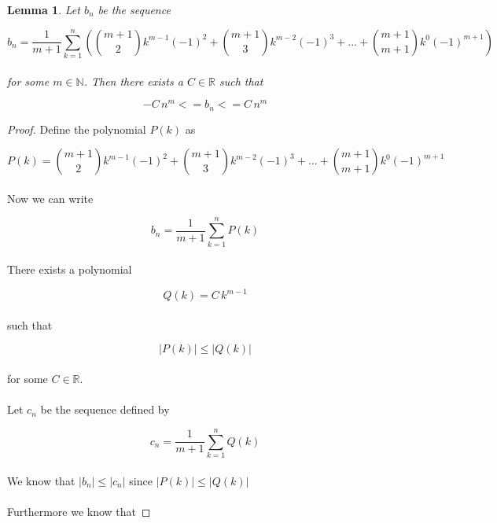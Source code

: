 \documentclass{article}
\newtheorem{lemma}{Lemma}
\begin{document}
\begin{lemma}
Let $b_{n}$ be the sequence 

\begin{equation*}
b_{n} = \frac{1}{m+1} \displaystyle \sum_{k=1}^{n} \left( \binom{m+1}{2} k^{m-1} (-1)^2 +  \binom{m+1}{3} k^{m-2} (-1)^3 + ... +  \binom{m+1}{m+1} k^{0} (-1)^{m+1} \right) 
\end{equation*}
\\
for some $m \in \mathbb{N}$. Then there exists a $C \in \mathbb{R}$ such that

\begin{equation*}
-C \, n^{m} <= b_{n} <= C \, n^{m}
\end{equation*}

\end{lemma}

\begin{proof}
Define the polynomial $P(k)$ as 

\begin{equation*}
P(k) = \binom{m+1}{2} k^{m-1} (-1)^2 +  \binom{m+1}{3} k^{m-2} (-1)^3 + ... +  \binom{m+1}{m+1} k^{0} (-1)^{m+1}
\end{equation*}
\\
Now we can write 

\begin{equation*}
b_{n} = \frac{1}{m+1} \displaystyle \sum_{k=1}^{n} P(k)
\end{equation*}
\\
There exists a polynomial 

\begin{equation*}
Q(k) = C \, k^{m-1}
\end{equation*}
\\
such that 

\begin{equation*}
|P(k)| \le |Q(k)|
\end{equation*}
\\
for some $C \in \mathbb{R}$. \\
\\
Let $c_{n}$ be the sequence defined by

\begin{equation*}
c_{n} = \frac{1}{m+1} \displaystyle \sum_{k=1}^{n} Q(k)
\end{equation*}
\\
We know that $|b_{n}| \le |c_{n}|$ since $|P(k)| \le |Q(k)|$ \\
\\
Furthermore we know that


\end{proof}
\end{document}
